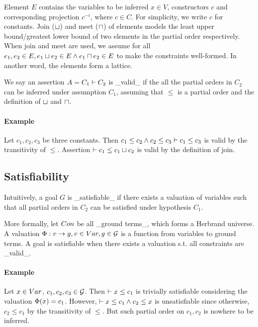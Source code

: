 Element $E$ contains the variables to be inferred $x\in V$, constructors $c$
and corresponding projection $c^{-i}$, where $c\in C$. For simplicity, we
write $c$ for constants. Join ($\sqcup$) and meet ($\sqcap$) of elements models
the least upper bound/greatest lower bound of two elements in the partial order
respectively. When join and meet are used, we assume for all $e_1, e_2 \in E,
e_1 \sqcup e_2 \in E \land e_1 \sqcap e_2 \in E$ to make the constraints
well-formed. In another word, the elements form a lattice.

We say an assertion $A = C_1 \vdash C_2$ is _valid_ if the all the partial
orders in $C_2$ can be inferred under assumption $C_1$, assuming that $\leq$ is
a partial order and the definition of $\sqcup$ and $\sqcap$.

\paragraph{Example}

Let $c_1, c_2, c_3$ be three constants. Then $c_1 \leq c_2 \land c_2 \leq c_3
\vdash c_1 \leq c_3$ is valid by the transitivity of $\leq$. Assertion $
\vdash c_1 \leq c_1 \sqcup c_2$ is valid by the definition of join. 

\subsection{Satisfiability}

Intuitively, a goal $G$ is _satisfiable_ if there exists a valuation of
variables such that all partial orders in $C_2$ can be satisfied under
hypothesis $C_1$.

More formally, let $Con$ be all _ground terms_, which forms a Herbrand
universe. A valuation $\Phi: v \to g, v\in Var, g\in \mathcal{G}$ is a
function from variables to ground terms. A goal is satisfiable when there
exists a valuation s.t. all constraints are _valid_. 

\paragraph{Example}

Let $x\in Var$, $c_1, c_2, c_3\in \mathcal{G}$. Then $\vdash x \leq c_1$ is
trivially satisfiable considering the valuation $\Phi(x)=c_1$. However,
$\vdash x \leq c_1 \land c_2 \leq x$ is unsatisfiable since otherwise, $c_2
\leq c_1$ by the transitivity of $\leq$. But such partial order on $c_1, c_2$
is nowhere to be inferred.

